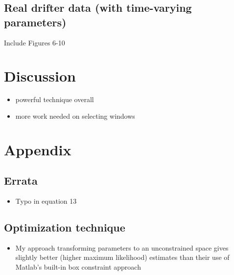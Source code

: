 \documentclass{stat572Style}
\begin{document}
	\subsection{Real drifter data (with time-varying parameters)}
		Include Figures 6-10

\section{Discussion}
	\begin{itemize}
		\item powerful technique overall
		\item more work needed on selecting windows
	\end{itemize}

\section{Appendix}

\subsection{Errata}
	\begin{itemize}
		\item Typo in equation 13
	\end{itemize}

\subsection{Optimization technique}
	\begin{itemize}
		\item My approach transforming parameters to an unconstrained space gives slightly better (higher maximum likelihood) estimates than their use of Matlab's built-in box constraint approach
			\end{itemize}



\end{document}
